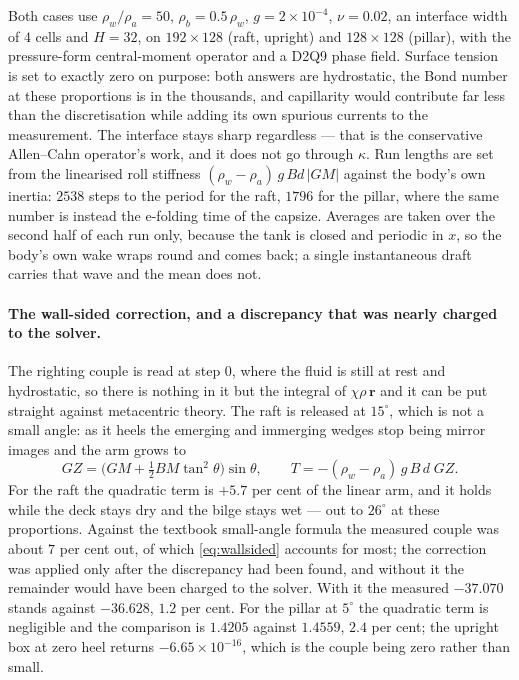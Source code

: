 \documentclass[11pt,a4paper]{article}
\newcommand{\e}[1]{\times 10^{#1}}
\begin{document}
Both cases use $\rho_w/\rho_a=50$, $\rho_b=0.5\,\rho_w$, $g=2\e{-4}$,
$\nu=0.02$, an interface width of $4$ cells and $H=32$, on $192\times128$ (raft,
upright) and $128\times128$ (pillar), with the pressure-form central-moment
operator and a D2Q9 phase field. Surface tension is set to exactly zero on
purpose: both answers are hydrostatic, the Bond number at these proportions is
in the thousands, and capillarity would contribute far less than the
discretisation while adding its own spurious currents to the measurement. The
interface stays sharp regardless --- that is the conservative Allen--Cahn
operator's work, and it does not go through $\kappa$. Run lengths are set from
the linearised roll stiffness $(\rho_w-\rho_a)\,g\,B d\,|GM|$ against the body's
own inertia: $2538$ steps to the period for the raft, $1796$ for the pillar,
where the same number is instead the e-folding time of the capsize. Averages are
taken over the second half of each run only, because the tank is closed and
periodic in $x$, so the body's own wake wraps round and comes back; a single
instantaneous draft carries that wave and the mean does not.

\paragraph{The wall-sided correction, and a discrepancy that was nearly charged
to the solver.} The righting couple is read at step $0$, where the fluid is still
at rest and hydrostatic, so there is nothing in it but the integral of
$\chi\rho\,\bm{r}$ and it can be put straight against metacentric theory. The
raft is released at $15^\circ$, which is not a small angle: as it heels the
emerging and immerging wedges stop being mirror images and the arm grows to
\begin{equation}
  GZ = \Big(GM + \tfrac12 BM \tan^2\theta\Big)\sin\theta ,
  \qquad
  T = -(\rho_w-\rho_a)\,g\,B\,d\;GZ .
  \label{eq:wallsided}
\end{equation}
For the raft the quadratic term is $+5.7$ per cent of the linear arm, and it
holds while the deck stays dry and the bilge stays wet --- out to $26^\circ$ at
these proportions. Against the textbook small-angle formula the measured couple
was about $7$ per cent out, of which \eqref{eq:wallsided} accounts for most; the
correction was applied only after the discrepancy had been found, and without it
the remainder would have been charged to the solver. With it the measured
$-37.070$ stands against $-36.628$, $1.2$ per cent. For the pillar at $5^\circ$
the quadratic term is negligible and the comparison is $1.4205$ against
$1.4559$, $2.4$ per cent; the upright box at zero heel returns $-6.65\e{-16}$,
which is the couple being zero rather than small.
\end{document}
